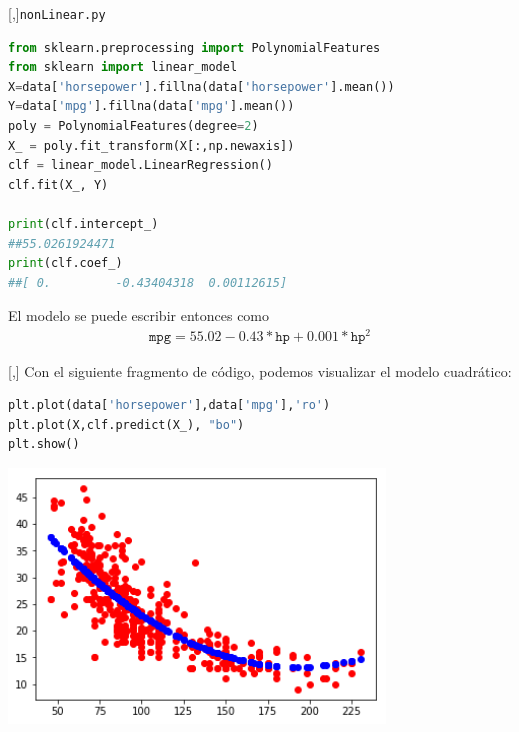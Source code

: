 [,]{\texttt{nonLinear.py}}
\begin{lstlisting}[language=Python]
from sklearn.preprocessing import PolynomialFeatures
from sklearn import linear_model
X=data['horsepower'].fillna(data['horsepower'].mean())
Y=data['mpg'].fillna(data['mpg'].mean())
poly = PolynomialFeatures(degree=2)
X_ = poly.fit_transform(X[:,np.newaxis])
clf = linear_model.LinearRegression()
clf.fit(X_, Y)

print(clf.intercept_)
##55.0261924471
print(clf.coef_)
##[ 0.         -0.43404318  0.00112615]
\end{lstlisting}


El modelo se puede escribir entonces como
\begin{align}
 \texttt{mpg}  = 55.02 -0.43*\texttt{hp}+0.001*\texttt{hp}^{2}
\end{align}

[,]{}
Con el siguiente fragmento de código, podemos visualizar el modelo cuadrático:
\begin{lstlisting}[language=Python]
plt.plot(data['horsepower'],data['mpg'],'ro')
plt.plot(X,clf.predict(X_), "bo")
plt.show()
\end{lstlisting}


\begin{center}
 \includegraphics[width=10cm,keepaspectratio=true]{./images/hpNLR.png}
\end{center}



